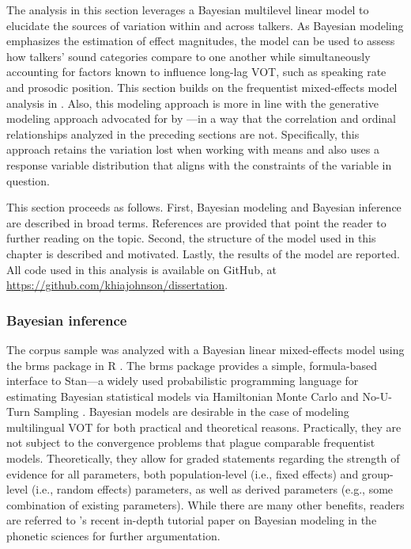 The analysis in this section leverages a Bayesian multilevel linear model to elucidate the sources of variation within and across talkers. As Bayesian modeling emphasizes the estimation of effect magnitudes, the model can be used to assess how talkers' sound categories compare to one another while simultaneously accounting for factors known to influence long-lag VOT, such as speaking rate and prosodic position. This section builds on the frequentist mixed-effects model analysis in \citet{chodroff_2017_structure}. Also, this modeling approach is more in line with the generative modeling approach advocated for by \citet{haines_2020_theoretically}---in a way that the correlation and ordinal relationships analyzed in the preceding sections are not. Specifically, this approach retains the variation lost when working with means and also uses a response variable distribution that aligns with the constraints of the variable in question. 

This section proceeds as follows. First, Bayesian modeling and Bayesian inference are described in broad terms. References are provided that point the reader to further reading on the topic. Second, the structure of the model used in this chapter is described and motivated. Lastly, the results of the model are reported. All code used in this analysis is available on GitHub, at \url{https://github.com/khiajohnson/dissertation}.

\subsubsection{Bayesian inference}

The corpus sample was analyzed with a Bayesian linear mixed-effects model using the brms package in R \citep{burkner_2017_brms, r_2021}. The brms package provides a simple, formula-based interface to Stan---a widely used probabilistic programming language for estimating Bayesian statistical models via Hamiltonian Monte Carlo and No-U-Turn Sampling \citep{stan_2021}. Bayesian models are desirable in the case of modeling multilingual VOT for both practical and theoretical reasons. Practically, they are not subject to the convergence problems that plague comparable frequentist models. Theoretically, they allow for graded statements regarding the strength of evidence for all parameters, both population-level (i.e., fixed effects) and group-level (i.e., random effects) parameters, as well as derived parameters (e.g., some combination of existing parameters). While there are many other benefits, readers are referred to \citeauthor{vasishth_2018_bayesian}'s \citeyearpar{vasishth_2018_bayesian} recent in-depth tutorial paper on Bayesian modeling in the phonetic sciences for further argumentation. 

